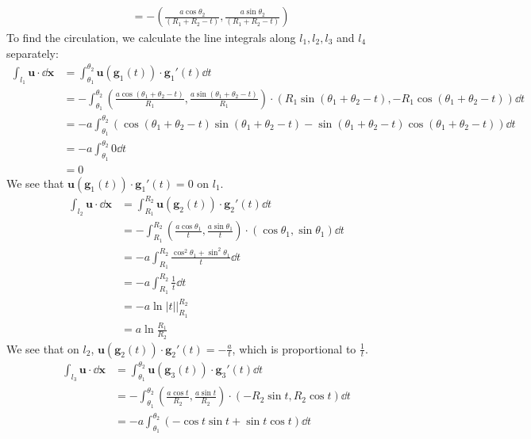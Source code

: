 \documentclass{article}
\begin{document}
\begin{enumerate}
\begin{enumerate}
\begin{enumerate}
\begin{align*}
      &= -\left(\frac{a\cos\theta_2}{(R_1+R_2-t) }, \frac{a\sin\theta_2}{(R_1+R_2-t) }\right)
    \end{align*}
    To find the circulation, we calculate the line integrals along \(l_1,l_2,l_3\) and \(l_4\) separately:
      \begin{align*}
      \int_{l_1} \mathbf{u}\cdot \dd\mathbf{x}
      &= \int_{\theta_1}^{\theta_2} \mathbf{u}(\mathbf{g}_1(t))\cdot \mathbf{g}_1'(t) \dd t\\
      &= -\int_{\theta_1}^{\theta_2}\left(\frac{a \cos(\theta_1 + \theta_2 -t )}{R_1}, \frac{a \sin(\theta_1 + \theta_2 -t )}{R_1}\right)\cdot (R_1\sin(\theta_1 + \theta_2 -t ), -R_1\cos(\theta_1 + \theta_2 -t )) \dd t\\
      &= -a \int_{\theta_1}^{\theta_2} (\cos(\theta_1 + \theta_2 -t ) \sin(\theta_1 + \theta_2 -t )-\sin(\theta_1 + \theta_2 -t )\cos(\theta_1 + \theta_2 -t ))\dd t\\
      &= -a\int_{\theta_1}^{\theta_2} 0 \dd t\\
      &= 0
      \end{align*}
      We see that \(\mathbf{u}(\mathbf{g}_1(t))\cdot \mathbf{g}_1'(t) = 0\) on \(l_1\).\\
    \begin{align*}
      \int_{l_2} \mathbf{u}\cdot \dd\mathbf{x}
      &= \int_{R_1}^{R_2} \mathbf{u}(\mathbf{g}_2(t))\cdot \mathbf{g}_2'(t) \dd t\\
      &= -  \int_{R_1}^{R_2} \left(\frac{a\cos\theta_1}{t}, \frac{a\sin\theta_1}{t}\right) \cdot  (\cos\theta_1, \sin\theta_1) \dd t\\
      &= - a\int_{R_1}^{R_2} \frac{\cos^2 \theta_1 + \sin^2\theta_1}{t} \dd t\\
      &= - a\int_{R_1}^{R_2} \frac{1}{t} \dd t \\
      &= -a \ln|t|\Big|_{R_1}^{R_2}\\
      &= a\ln\frac{R_1}{R_2}
    \end{align*}
    We see that on \(l_2\), \(\mathbf{u}(\mathbf{g}_2(t))\cdot \mathbf{g}_2'(t) = -\frac{a}{t}\), which is proportional to \(\frac{1}{t}\).
    \begin{align*}
      \int_{l_3} \mathbf{u}\cdot \dd\mathbf{x}
      &= \int_{\theta_1}^{\theta_2} \mathbf{u}(\mathbf{g}_3(t))\cdot \mathbf{g}_3'(t) \dd t\\
      &= - \int_{\theta_1}^{\theta_2} \left(\frac{a\cos t}{R_2}, \frac{a\sin t}{R_2}\right) \cdot (-R_2 \sin t, R_2\cos t) \dd t\\
      &= -a \int_{\theta_1}^{\theta_2} (-\cos t\sin t + \sin t \cos t) \dd t\\

\end{align*}
\end{enumerate}
\end{enumerate}
\end{enumerate}
\end{document}

